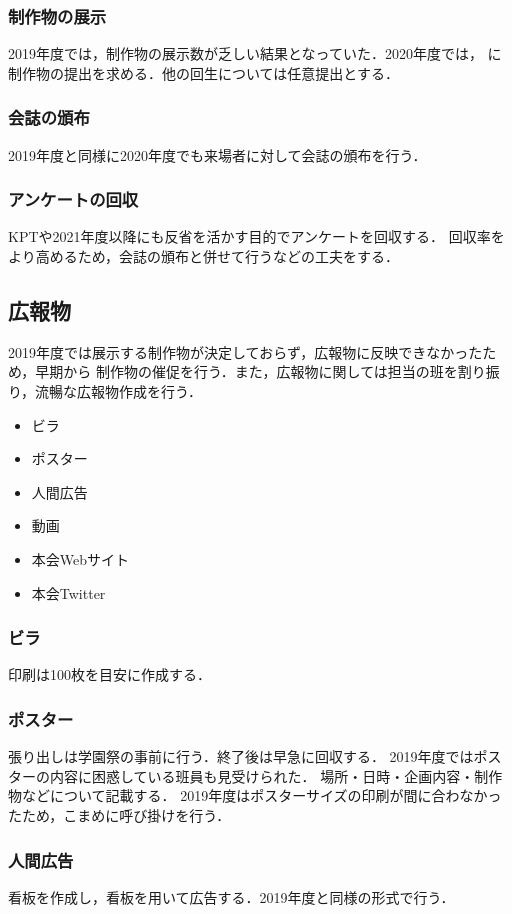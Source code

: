 \subsubsection*{制作物の展示}
2019年度では，制作物の展示数が乏しい結果となっていた．2020年度では，\secondGrade{}
に制作物の提出を求める．他の回生については任意提出とする．

\subsubsection*{会誌の頒布}
2019年度と同様に2020年度でも来場者に対して会誌の頒布を行う．

\subsubsection*{アンケートの回収}
KPTや2021年度以降にも反省を活かす目的でアンケートを回収する．
回収率をより高めるため，会誌の頒布と併せて行うなどの工夫をする．

\subsection*{広報物}
2019年度では展示する制作物が決定しておらず，広報物に反映できなかったため，早期から
制作物の催促を行う．また，広報物に関しては担当の班を割り振り，流暢な広報物作成を行う．
\begin{itemize}
    \item ビラ
    \item ポスター
    \item 人間広告
    \item 動画
    \item 本会Webサイト
    \item 本会Twitter
    \end{itemize}
\subsubsection*{ビラ}
印刷は100枚を目安に作成する．

\subsubsection*{ポスター}
張り出しは学園祭の事前に行う．終了後は早急に回収する．
2019年度ではポスターの内容に困惑している班員も見受けられた．
場所・日時・企画内容・制作物などについて記載する．
2019年度はポスターサイズの印刷が間に合わなかったため，こまめに呼び掛けを行う．

\subsubsection*{人間広告}
看板を作成し，看板を用いて広告する．2019年度と同様の形式で行う．

